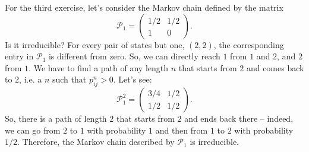 \documentclass{gulartcl}
\begin{document}
For the third exercise, let’s consider the Markov chain defined by the matrix
\begin{equation}
    \mathcal{P}_{1} =
    \begin{pmatrix}
        1/2 & 1/2 \\
         1  &  0
    \end{pmatrix}.
\end{equation}
Is it irreducible? For every pair of states but one, $(2, 2)$, the corresponding
entry in $\mathcal{P}_1$ is different from zero. So, we can directly reach $1$
from $1$ and $2$, and $2$ from $1$. We have to find a path of any length $n$
that starts from $2$ and comes back to $2$, i.e. a $n$ such that $p^{n}_{ij} >
0$. Let’s see:
\begin{equation}
    \mathcal{P}_{1}^{2} =
    \begin{pmatrix}
        3/4 & 1/2 \\
        1/2 & 1/2
    \end{pmatrix}.
\end{equation}
So, there is a path of length $2$ that starts from $2$ and ends back there –
indeed, we can go from $2$ to $1$ with probability $1$ and then from $1$ to $2$
with probability $1/2$. Therefore, the Markov chain described by $\mathcal{P}_1$
is irreducible.
\end{document}
